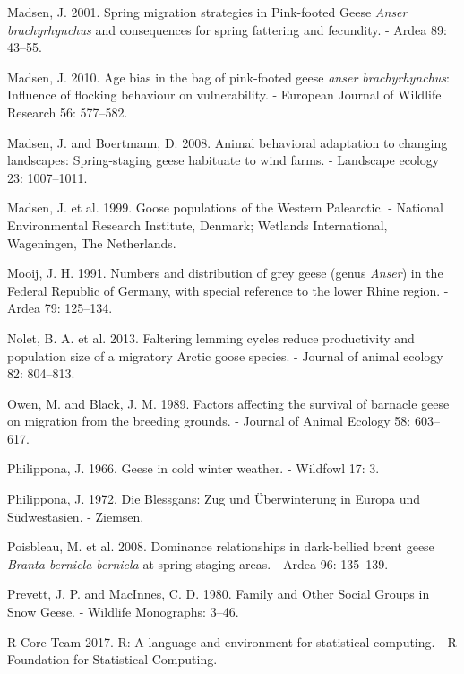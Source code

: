 \documentclass[10pt,twocolumn]{paper}
\begin{document}
\hypertarget{ref-madsen2001spring}{}
Madsen, J. 2001. Spring migration strategies in Pink-footed Geese
\emph{Anser brachyrhynchus} and consequences for spring fattering and
fecundity. - Ardea 89: 43--55.

\hypertarget{ref-Madsen2010}{}
Madsen, J. 2010. Age bias in the bag of pink-footed geese \emph{anser
brachyrhynchus}: Influence of flocking behaviour on vulnerability. -
European Journal of Wildlife Research 56: 577--582.

\hypertarget{ref-madsen2008animal}{}
Madsen, J. and Boertmann, D. 2008. Animal behavioral adaptation to
changing landscapes: Spring-staging geese habituate to wind farms. -
Landscape ecology 23: 1007--1011.

\hypertarget{ref-madsen1999goose}{}
Madsen, J. et al. 1999. Goose populations of the Western Palearctic. -
National Environmental Research Institute, Denmark; Wetlands
International, Wageningen, The Netherlands.

\hypertarget{ref-mooij1991numbers}{}
Mooij, J. H. 1991. Numbers and distribution of grey geese (genus
\emph{Anser}) in the Federal Republic of Germany, with special reference
to the lower Rhine region. - Ardea 79: 125--134.

\hypertarget{ref-nolet2013faltering}{}
Nolet, B. A. et al. 2013. Faltering lemming cycles reduce productivity
and population size of a migratory Arctic goose species. - Journal of
animal ecology 82: 804--813.

\hypertarget{ref-owen1989survival}{}
Owen, M. and Black, J. M. 1989. Factors affecting the survival of
barnacle geese on migration from the breeding grounds. - Journal of
Animal Ecology 58: 603--617.

\hypertarget{ref-philippona1966geese}{}
Philippona, J. 1966. Geese in cold winter weather. - Wildfowl 17: 3.

\hypertarget{ref-philippona1972blessgans}{}
Philippona, J. 1972. Die Blessgans: Zug und Überwinterung in Europa und
Südwestasien. - Ziemsen.

\hypertarget{ref-poisbleau2008dominance}{}
Poisbleau, M. et al. 2008. Dominance relationships in dark-bellied brent
geese \emph{Branta bernicla bernicla} at spring staging areas. - Ardea
96: 135--139.

\hypertarget{ref-prevett1980snow}{}
Prevett, J. P. and MacInnes, C. D. 1980. Family and Other Social Groups
in Snow Geese. - Wildlife Monographs: 3--46.

\hypertarget{ref-R}{}
R Core Team 2017. R: A language and environment for statistical
computing. - R Foundation for Statistical Computing.
\end{document}
